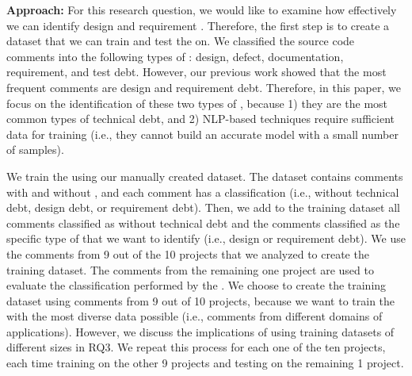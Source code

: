 \vspace{1mm}
\noindent \textbf{Approach:} For this research question, we would like to examine how effectively we can identify design and requirement \SATD. Therefore, the first step is to create a dataset that we can train and test the  on. We classified the source code comments into the following types of \SATD: design, defect, documentation, requirement, and test debt. However, our previous work showed that the most frequent \SATD comments are design and requirement debt. Therefore, in this paper, we focus on the identification of these two types of \SATD, because 1) they are the most common types of technical debt, and 2) NLP-based techniques require sufficient data for training (i.e., they cannot build an accurate model with a small number of samples).

We train the  using our manually created dataset. The dataset contains comments with and without \SATD, and each comment has a classification (i.e., without technical debt, design debt, or requirement debt). Then, we add to the training dataset all comments classified as without technical debt and the comments classified as the specific type of \SATD that we want to identify (i.e., design or requirement debt). We use the comments from 9 out of the 10 projects that we analyzed to create the training dataset. The comments from the remaining one project are used to evaluate the classification performed by the . We choose to create the training dataset using comments from 9 out of 10 projects, because we want to train the  with the most diverse data possible (i.e., comments from different domains of applications). However, we discuss the implications of using training datasets of different sizes in RQ3. We repeat this process for each one of the ten projects, each time training on the other 9 projects and testing on the remaining 1 project.

